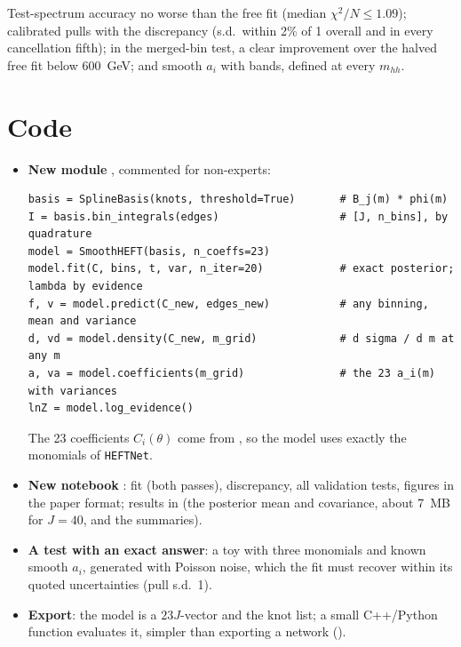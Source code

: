 \begin{keyidea}
Test-spectrum accuracy no worse than the free fit (median $\chi^2/N \le 1.09$); calibrated
pulls with the discrepancy (s.d.\ within 2\% of 1 overall and in every cancellation fifth);
in the merged-bin test, a clear improvement over the halved free fit below 600~GeV; and smooth
$a_i$ with bands, defined at every $m_{hh}$.
\end{keyidea}

\section{Code}

\begin{itemize}
  \item \textbf{New module }, commented for non-experts:
\begin{lstlisting}
basis = SplineBasis(knots, threshold=True)       # B_j(m) * phi(m)
I = basis.bin_integrals(edges)                   # [J, n_bins], by quadrature
model = SmoothHEFT(basis, n_coeffs=23)
model.fit(C, bins, t, var, n_iter=20)            # exact posterior; lambda by evidence
f, v = model.predict(C_new, edges_new)           # any binning, mean and variance
d, vd = model.density(C_new, m_grid)             # d sigma / d m at any m
a, va = model.coefficients(m_grid)               # the 23 a_i(m) with variances
lnZ = model.log_evidence()
\end{lstlisting}
    The 23 coefficients $C_i(\theta)$ come from , so the
    model uses exactly the monomials of \texttt{HEFTNet}.
  \item \textbf{New notebook }: fit (both passes), discrepancy,
    all validation tests, figures in the paper format; results in 
    (the posterior mean and covariance, about 7~MB for $J = 40$, and the summaries).
  \item \textbf{A test with an exact answer}: a toy with three monomials and known smooth
    $a_i$, generated with Poisson noise, which the fit must recover within its quoted
    uncertainties (pull s.d.\ 1).
  \item \textbf{Export}: the model is a $23J$-vector and the knot list; a small C++/Python
    function evaluates it, simpler than exporting a network ().
\end{itemize}

